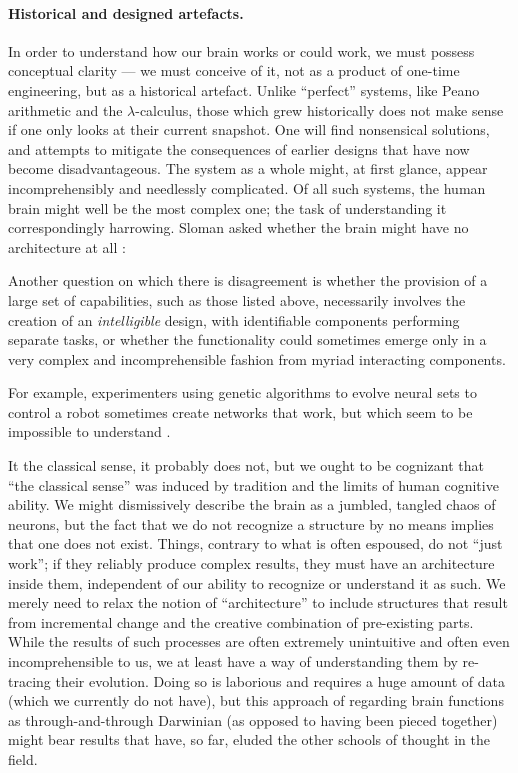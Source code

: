 \paragraph{Historical and designed artefacts.} In order to understand how our brain works or could work, we must possess conceptual clarity --- we must conceive of it, not as a product of one-time engineering, but as a historical artefact. Unlike ``perfect'' systems, like Peano arithmetic and the $\lambda$-calculus, those which grew historically does not make sense if one only looks at their current snapshot. One will find nonsensical solutions, and attempts to mitigate the consequences of earlier designs that have now become disadvantageous. The system as a whole might, at first glance, appear incomprehensibly and needlessly complicated. Of all such systems, the human brain might well be the most complex one; the task of understanding it correspondingly harrowing. Sloman asked whether the brain might have no architecture at all  \cite[p.\ 5]{sloman1997}:

\begin{emquote}
	Another question on which there is disagreement is whether the provision of a large set of capabilities, such as those listed above, necessarily involves the creation of an {\em intelligible} design, with identifiable components performing separate tasks, or whether the functionality could sometimes  emerge only in a very complex and incomprehensible fashion from myriad interacting components.
	
	For example, experimenters using genetic algorithms to evolve neural sets to control a robot sometimes create networks that work, but which seem to be impossible to understand .
\end{emquote}

It the classical sense, it probably does not, but we ought to be cognizant that ``the classical sense'' was induced by tradition and the limits of human cognitive ability. We might dismissively describe the brain as a jumbled, tangled chaos of neurons, but the fact that we do not recognize a structure by no means implies that one does not exist. Things, contrary to what is often espoused, do not ``just work''; if they reliably produce complex results, they must have an architecture inside them, independent of our ability to recognize or understand it as such. We merely need to relax the notion of ``architecture'' to include structures that result from incremental change and the creative combination of pre-existing parts. While the results of such processes are often extremely unintuitive and often even incomprehensible to us, we at least have a way of understanding them by re-tracing their evolution. Doing so is laborious and requires a huge amount of data (which we currently do not have), but this approach of regarding brain functions as through-and-through Darwinian (as opposed to having been pieced together) might bear results that have, so far, eluded the other schools of thought in the field.

